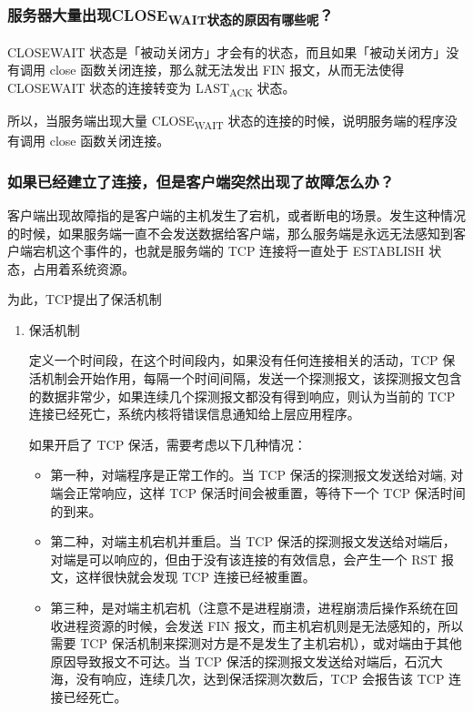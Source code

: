 \documentclass[11pt]{article}
\begin{document}
\subsubsection{服务器大量出现CLOSE\textsubscript{WAIT状态的原因有哪些呢}？}
\label{sec:orgc760faf}
CLOSEWAIT 状态是「被动关闭方」才会有的状态，而且如果「被动关闭方」没有调用 close 函数关闭连接，那么就无法发出 FIN 报文，从而无法使得 CLOSEWAIT 状态的连接转变为 LAST\textsubscript{ACK} 状态。

所以，当服务端出现大量 CLOSE\textsubscript{WAIT} 状态的连接的时候，说明服务端的程序没有调用 close 函数关闭连接。
\subsubsection{如果已经建立了连接，但是客户端突然出现了故障怎么办？}
\label{sec:orga9b4698}

客户端出现故障指的是客户端的主机发生了宕机，或者断电的场景。发生这种情况的时候，如果服务端一直不会发送数据给客户端，那么服务端是永远无法感知到客户端宕机这个事件的，也就是服务端的 TCP 连接将一直处于 ESTABLISH 状态，占用着系统资源。

为此，TCP提出了保活机制
\begin{enumerate}
\item 保活机制
\label{sec:orgf4c0540}

定义一个时间段，在这个时间段内，如果没有任何连接相关的活动，TCP 保活机制会开始作用，每隔一个时间间隔，发送一个探测报文，该探测报文包含的数据非常少，如果连续几个探测报文都没有得到响应，则认为当前的 TCP 连接已经死亡，系统内核将错误信息通知给上层应用程序。

如果开启了 TCP 保活，需要考虑以下几种情况：
\begin{itemize}
\item 第一种，对端程序是正常工作的。当 TCP 保活的探测报文发送给对端, 对端会正常响应，这样 TCP 保活时间会被重置，等待下一个 TCP 保活时间的到来。
\item 第二种，对端主机宕机并重启。当 TCP 保活的探测报文发送给对端后，对端是可以响应的，但由于没有该连接的有效信息，会产生一个 RST 报文，这样很快就会发现 TCP 连接已经被重置。
\item 第三种，是对端主机宕机（注意不是进程崩溃，进程崩溃后操作系统在回收进程资源的时候，会发送 FIN 报文，而主机宕机则是无法感知的，所以需要 TCP 保活机制来探测对方是不是发生了主机宕机），或对端由于其他原因导致报文不可达。当 TCP 保活的探测报文发送给对端后，石沉大海，没有响应，连续几次，达到保活探测次数后，TCP 会报告该 TCP 连接已经死亡。
\end{itemize}
\end{enumerate}
\end{document}
